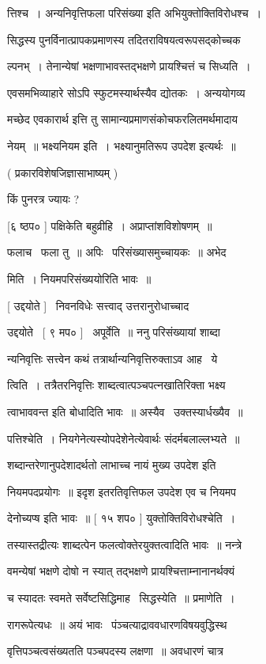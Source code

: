 \documentclass[11pt, openany]{book}
\begin{document}
त्तिश्च~। {\qt अन्यनिवृत्तिफला परिसंख्या} इति अभियुक्तोक्तिविरोधश्च~। 

सिद्धस्य पुनर्विनात्प्रापकप्रमाणस्य तदितराविषयत्वरूपसद्कोच्चक \textendash\ 

ल्पनभ्~। तेनान्येषां भक्षणाभावस्तद्भक्षणे प्रायश्चित्तं च सिध्यति~। 

एवसमभिव्याहारे सोऽपि स्फुटमस्यार्थस्यैव द्योतकः~। अन्ययोगव्य \textendash\ 

मच्छेद एवकारार्थ इत्ति तु सामान्यप्रमाणसंकोचफरलितमर्थमादाय 

नेयम्~॥ भक्ष्यनियम इति~। भक्ष्यानुमतिरूप उपदेश इत्यर्थः~॥ 

( प्रकारविशेषजिज्ञासाभाष्यम् ) 

किं पुनरत्र ज्यायः ? 

[६ ष्ठप० ] पक्षिकेति बहुव्रीहि~। अप्राप्तांशविशोषणम्~॥ 

फलाच \textendash\ फला तु~॥ अपिः \textendash\ परिसंख्यासमुच्चायकः~॥ अभेद \textendash\ 

मिति~। नियमपरिसंख्ययोरिति भावः~॥ 

[ उद्दयोते ] \textendash\ निवनविधेः सत्त्वाद् उत्तरानुरोधाच्चाद \textendash\ 

उद्दयोते \textendash\ [ ९ मप० ] \textendash\ अपूर्वेति~॥ ननु परिसंख्यायां शाब्दा \textendash\ 

न्यनिवृत्तिः सत्त्वेन कथं तत्रार्थान्यनिवृत्तिरुक्ताऽव आह \textendash\ ये 

त्विति~। तत्रैतरनिवृत्तिः शाब्दत्वात्पञ्चपत्नखातिरिक्ता भक्ष्य \textendash\ 

त्वाभाववन्त इति बोधादिति भावः~॥ अस्यैव \textendash\ उक्तस्यार्धख्यैव~॥ 

पत्तिश्चेति~। नियगेनेत्यस्योपदेशेनेत्येवार्थः संदर्मबलाल्लभ्यते~॥ 

शब्दान्तरेणानुपदेशादर्थतो लाभाच्च नायं मुख्य उपदेश इति 

नियमपदप्रयोगः~॥ इदृश इतरतिवृत्तिफल उपदेश एव च नियमप \textendash\ 

देनोच्यप्ष इति भावः~॥ [ १५ शप० ] युक्तोक्तिविरोधश्चेति~। 

तस्यास्तद्रीत्यः शाब्दत्पेन फलत्वोक्तेरयुक्तत्वादिति भावः~॥ नन्त्रे \textendash\ 


वमन्येषां भक्षणे दोषो न स्यात् तद्भक्षणे प्रायश्चित्ताम्नानानर्थक्यं 

च स्यादतः स्वमते सर्वेष्टसिद्धिमाह \textendash\ सिद्धस्येति~॥ प्रमाणेति~। 

रागरूपेत्यधः~॥ अयं भावः \textendash\ पंञ्चत्याद्राववधारणविषयवुद्धिस्थ \textendash\ 

वृत्तिपञ्चत्वसंख्यतति पञ्चपदस्य लक्षणा~॥ अवधारणं चात्र 
\end{document}
